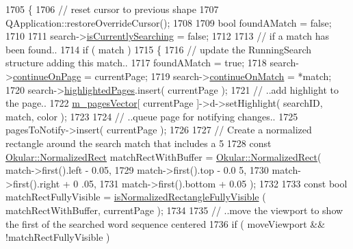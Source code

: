 \begin{DoxyCode}
1705 \{
1706     \textcolor{comment}{// reset cursor to previous shape}
1707     QApplication::restoreOverrideCursor();
1708 
1709     \textcolor{keywordtype}{bool} foundAMatch = \textcolor{keyword}{false};
1710 
1711     search->\hyperlink{structRunningSearch_a2683a901cf457f541ca4662294e02cec}{isCurrentlySearching} = \textcolor{keyword}{false};
1712 
1713     \textcolor{comment}{// if a match has been found..}
1714     \textcolor{keywordflow}{if} ( match )
1715     \{
1716         \textcolor{comment}{// update the RunningSearch structure adding this match..}
1717         foundAMatch = \textcolor{keyword}{true};
1718         search->\hyperlink{structRunningSearch_a69213b1663cb154fee0cca4b877c4c05}{continueOnPage} = currentPage;
1719         search->\hyperlink{structRunningSearch_acd3938eb8c9ccc97de83af80d68e55bf}{continueOnMatch} = *match;
1720         search->\hyperlink{structRunningSearch_a5827c4228354199d0a4447dca7f19fb1}{highlightedPages}.insert( currentPage );
1721         \textcolor{comment}{// ..add highlight to the page..}
1722         \hyperlink{classOkular_1_1DocumentPrivate_a73b852d9a73ffe8061b66dbf9b290f17}{m\_pagesVector}[ currentPage ]->d->setHighlight( searchID, match, color );
1723 
1724         \textcolor{comment}{// ..queue page for notifying changes..}
1725         pagesToNotify->insert( currentPage );
1726 
1727         \textcolor{comment}{// Create a normalized rectangle around the search match that includes a 5%
1728         \textcolor{keyword}{const} \hyperlink{classOkular_1_1NormalizedRect}{Okular::NormalizedRect} matchRectWithBuffer = 
      \hyperlink{classOkular_1_1NormalizedRect}{Okular::NormalizedRect}( match->first().left - 0.05,
1729                                                                                    match->first().top - 0.0
      5,
1730                                                                                    match->first().right + 0
      .05,
1731                                                                                    match->first().bottom + 
      0.05 );
1732 
1733         \textcolor{keyword}{const} \textcolor{keywordtype}{bool} matchRectFullyVisible = \hyperlink{classOkular_1_1DocumentPrivate_a6a3aff2f64cb37c3c1f50a778e43abfa}{isNormalizedRectangleFullyVisible}
      ( matchRectWithBuffer, currentPage );
1734 
1735         \textcolor{comment}{// ..move the viewport to show the first of the searched word sequence centered}
1736         \textcolor{keywordflow}{if} ( moveViewport && !matchRectFullyVisible )
}
\end{DoxyCode}
